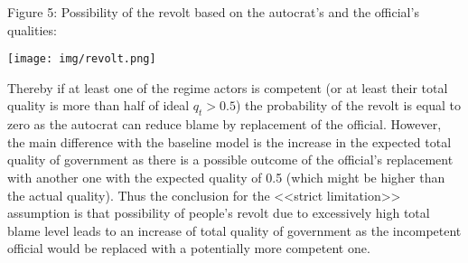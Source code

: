 \documentclass[a4paper, 12pt]{article}
\begin{document}
    		
	\begin{center}
	    Figure 5: Possibility of the revolt based on the autocrat's and the official's qualities:
	    
	    \texttt{[image: img/revolt.png]}
	    
	\end{center}
	

	\noindent Thereby if at least one of the regime actors is competent (or at least their total quality is more than half of ideal $q_t > 0.5$) the probability of the revolt is equal to zero as the autocrat can reduce blame by replacement of the official. However, the main difference with the baseline model is the increase in the expected total quality of government as there is a possible outcome of the official's replacement with another one with the expected quality of 0.5 (which might be higher than the actual quality). Thus the conclusion for the <<strict limitation>> assumption is that possibility of people's revolt due to excessively high total blame level leads to an increase of total quality of government as the incompetent official would be replaced with a potentially more competent one.
	
\end{document}
